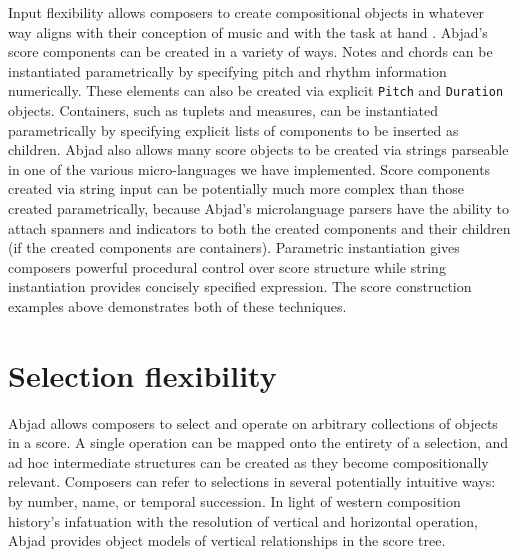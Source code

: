 \documentclass{article}
\begin{document}
Input flexibility allows composers to create compositional objects in whatever
way aligns with their conception of music and with the task at hand
\cite{Kay:1996vn}. Abjad's score components can be created in a variety of
ways. Notes and chords can be instantiated parametrically by specifying
pitch and rhythm information numerically. These elements can also be created via
explicit \texttt{Pitch} and \texttt{Duration} objects. Containers, such as
tuplets and measures, can be instantiated parametrically by specifying explicit
lists of components to be inserted as children. Abjad also allows many score
objects to be created via strings parseable in one of the various
micro-languages we have implemented. Score components created via string input
can be potentially much more complex than those created parametrically, because
Abjad's microlanguage parsers have the ability to attach spanners and
indicators to both the created components and their children (if the created
components are containers). Parametric instantiation gives composers powerful
procedural control over score structure while string instantiation provides
concisely specified expression. The score construction examples above
demonstrates both of these techniques.

\section{Selection flexibility} \label{sec:selection-flexibility}

Abjad allows composers to select and operate on arbitrary collections of
objects in a score. A single operation can be mapped onto the entirety of a
selection, and ad hoc intermediate structures can be created as they become
compositionally relevant. Composers can refer to selections in several
potentially intuitive ways: by number, name, or temporal succession. In light
of western composition history's infatuation with the resolution of vertical
and horizontal operation, Abjad provides object models of vertical
relationships in the score tree.



\end{document}
